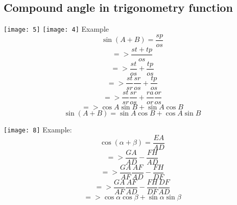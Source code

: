 	\subsection{Compound angle in trigonometry function}
	\texttt{[image: 5]}
	\texttt{[image: 4]}
	\newline
	Example
	\begin{equation}
	\sin(A+B)=\frac{sp}{os}
	\end{equation}
	\begin{displaymath}
	=>\frac{st+tp}{os}
	\end{displaymath}
	\begin{displaymath}
	=>\frac{st}{os}+\frac{tp}{os}
	\end{displaymath}
	\begin{displaymath}
	=>\frac{st}{sr}\frac{sr}{os}+\frac{tp}{os}
	\end{displaymath}
	\begin{displaymath}
	=>\frac{st}{sr}\frac{sr}{os}+\frac{ra}{or}\frac{or}{os}
	\end{displaymath}
	\begin{displaymath}
	=> \cos A\sin B+\sin A\cos B
	\end{displaymath}
	\begin{equation}
	\sin(A+B) = \sin A\cos B+\cos A\sin B
	\end{equation}
	
	\texttt{[image: 8]}
	\newline
	Example:
	\newline
	\begin{displaymath}
	\cos(\alpha+\beta) = \frac{EA}{AD}
	\end{displaymath}
	\begin{displaymath}
	=> \frac{GA}{AD}-\frac{FH}{AD}
	\end{displaymath}
	\begin{displaymath}
	=> \frac{GA}{AF}\frac{AF}{AD}-\frac{FH}{DF}
	\end{displaymath}
	\begin{displaymath}
	=> \frac{GA}{AF}\frac{AF}{AD}-\frac{FH}{DF}\frac{DF}{AD}
	\end{displaymath}
	\begin{equation}
	=> \cos\alpha \cos\beta + \sin\alpha \sin\beta
	\end{equation}
	
